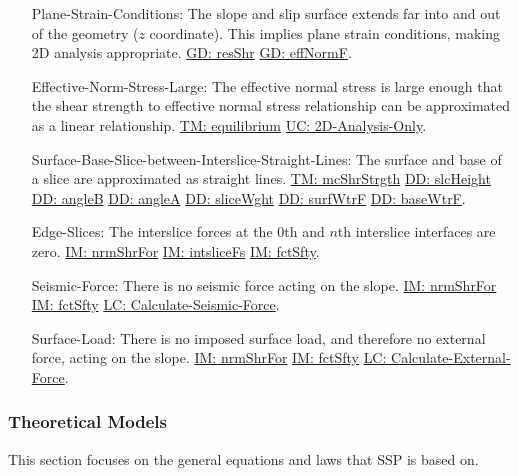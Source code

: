 \documentclass[12pt]{article}
\begin{document}
\begin{itemize}
\item[Plane-Strain-Conditions:\phantomsection\label{assumpPSC}]The slope and slip surface extends far into and out of the geometry ($z$ coordinate). This implies plane strain conditions, making 2D analysis appropriate. \hyperref[GD:resShr]{GD: resShr} \hyperref[GD:effNormF]{GD: effNormF}.
\item[Effective-Norm-Stress-Large:\phantomsection\label{assumpENSL}]The effective normal stress is large enough that the shear strength to effective normal stress relationship can be approximated as a linear relationship. \hyperref[TM:equilibrium]{TM: equilibrium} \hyperref[UC_2donly]{UC: 2D-Analysis-Only}.
\item[Surface-Base-Slice-between-Interslice-Straight-Lines:\phantomsection\label{assumpSBSBISL}]The surface and base of a slice are approximated as straight lines. \hyperref[TM:mcShrStrgth]{TM: mcShrStrgth} \hyperref[DD:slcHeight]{DD: slcHeight} \hyperref[DD:angleB]{DD: angleB} \hyperref[DD:angleA]{DD: angleA} \hyperref[DD:sliceWght]{DD: sliceWght} \hyperref[DD:surfWtrF]{DD: surfWtrF} \hyperref[DD:baseWtrF]{DD: baseWtrF}.
\item[Edge-Slices:\phantomsection\label{assumpES}]The interslice forces at the 0th and $n$th interslice interfaces are zero. \hyperref[IM:nrmShrFor]{IM: nrmShrFor} \hyperref[IM:intsliceFs]{IM: intsliceFs} \hyperref[IM:fctSfty]{IM: fctSfty}.
\item[Seismic-Force:\phantomsection\label{assumpSF}]There is no seismic force acting on the slope. \hyperref[IM:nrmShrFor]{IM: nrmShrFor} \hyperref[IM:fctSfty]{IM: fctSfty} \hyperref[LC_seismic]{LC: Calculate-Seismic-Force}.
\item[Surface-Load:\phantomsection\label{assumpSL}]There is no imposed surface load, and therefore no external force, acting on the slope. \hyperref[IM:nrmShrFor]{IM: nrmShrFor} \hyperref[IM:fctSfty]{IM: fctSfty} \hyperref[LC_external]{LC: Calculate-External-Force}.
\end{itemize}
\subsubsection{Theoretical Models}
\label{Sec:TMs}
This section focuses on the general equations and laws that SSP is based on.
\par~
\end{document}

